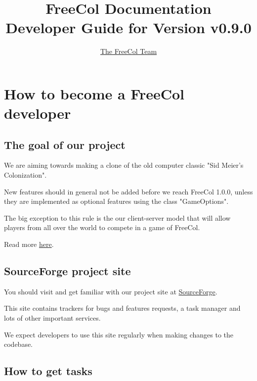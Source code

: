 \documentclass[12pt]{book}
\begin{document}
\author{\href{http://freecol.sourceforge.net/index.php?section=8}{The FreeCol Team}}
\title{FreeCol Documentation\\Developer Guide for Version v0.9.0}
\maketitle{}

\tableofcontents
\newpage


\hypertarget{How to become a FreeCol developer}
            {\chapter{How to become a FreeCol developer}}



\hypertarget{The goal of our project}{\section{The goal of our project}}

We are aiming towards making a clone of the old computer
classic "Sid Meier's Colonization".

New features should in general not be added before we reach
FreeCol 1.0.0, unless they are implemented as optional features
using the class "GameOptions".

The big exception to this rule is the our client-server model that
will allow players from all over the world to compete in a game
of FreeCol.

Read more \href{http://www.freecol.org/index.php?section=2}{here}.


\hypertarget{SourceForge project site}{\section{SourceForge project site}}

You should visit and get familiar with our project site at
\href{http://sourceforge.net/projects/freecol/}{SourceForge}.

This site contains trackers for bugs and features requests,
a task manager and lots of other important services.

We expect developers to use this site regularly when making
changes to the codebase.


\hypertarget{How to get tasks}{\section{How to get tasks}}
\end{document}
